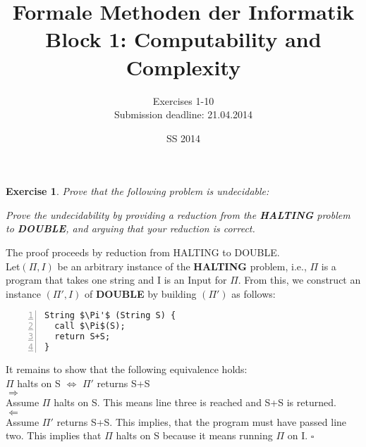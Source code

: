 \documentclass [11pt]{article}
\title{Formale Methoden der Informatik \\
Block 1: Computability and Complexity }
\author{Exercises 1-10 \\
Submission deadline: 21.04.2014}
\date{SS 2014}
\newtheorem{exercise}[theorem]{Exercise}
\newcommand{\solution}[1]{\noindent {\bf Solution.}  #1}
\begin{document}
\maketitle


\begin{exercise}
  Prove that the following problem is undecidable:

  \begin{center}
  \end{center}
  Prove the undecidability by providing a reduction from the \textbf{HALTING}
  problem to \textbf{DOUBLE}, and arguing that your reduction is correct.
\end{exercise}


\solution{The proof proceeds by reduction from HALTING to DOUBLE.\\
Let$(\Pi,I)$ be an arbitrary instance of the \textbf{HALTING} problem, i.e., $\Pi$ is a program that takes one string and I is an Input for $\Pi$.
From this, we construct an instance $(\Pi',I)$ of \textbf{DOUBLE} by building $(\Pi')$ as follows:\\}

\begin{lstlisting}[label=haltingtodouble,caption=$\Pi'$,mathescape, numbers=left, numberstyle=\tiny]
String $\Pi'$ (String S) {
  call $\Pi$(S);
  return S+S;
}
\end{lstlisting}
It remains to show that the following equivalence holds:\\
$\Pi$ halts on S $\Leftrightarrow$ $\Pi'$ returns S+S\\
$\Rightarrow$\\
Assume $\Pi$ halts on S. This means line three is reached and S+S is returned.\\
$\Leftarrow$\\
Assume $\Pi'$ returns S+S. This implies, that the program must have passed line two.
This implies that $\Pi$ halts on S because it means running $\Pi$ on I.
$\square$
\end{document}
